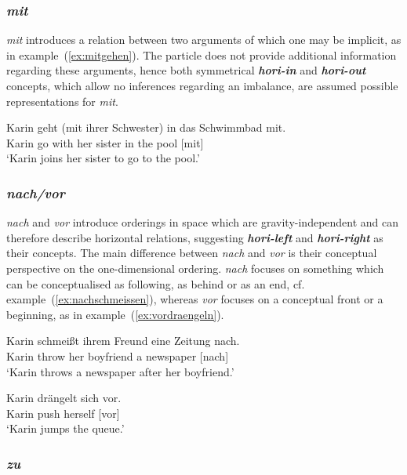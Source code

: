 \documentclass[output=paper]{langsci/langscibook}
\newcommand{\textci}[1]{\textit{\textbf{#1}}}
\begin{document}
\vspace{+1mm}
\subsubsection{\textit{mit}}

\textit{mit} introduces a relation between two arguments of which one
may be implicit, as in example~(\ref{ex:mitgehen}). The particle does
not provide additional information regarding these arguments, hence
both symmetrical \textci{hori-in} and \textci{hori-out} concepts,
which allow no inferences regarding an imbalance, are assumed possible
representations for \textit{mit}.

\ea\label{ex:mitgehen}
\gll Karin geht (mit ihrer Schwester) in das Schwimmbad mit.\\
Karin go with her sister in the pool [mit]\\
\glt `Karin joins her sister to go to the pool.'
\z

\vspace{+1mm}
\subsubsection{\textit{nach/vor}}

\textit{nach} and \textit{vor} introduce orderings in space which are
gravity-independent and can therefore describe horizontal relations,
suggesting \textci{hori-left} and \textci{hori-right} as their
concepts. The main difference between \textit{nach} and \textit{vor}
is their conceptual perspective on the one-dimensional
ordering. \textit{nach} focuses on something which can be
conceptualised as following, as behind or as an end, cf.
example~(\ref{ex:nachschmeissen}), whereas \textit{vor} focuses on a
conceptual front or a beginning, as in
example~(\ref{ex:vordraengeln}).

\ea\label{ex:nachschmeissen}
\gll Karin schmeißt ihrem Freund eine Zeitung nach.\\
Karin throw her boyfriend a newspaper [nach]\\
\glt `Karin throws a newspaper after her boyfriend.' 
\z

\ea\label{ex:vordraengeln}
\gll Karin drängelt sich vor.\\
Karin push herself [vor]\\
\glt `Karin jumps the queue.'
\z

\vspace{+1mm}
\subsubsection{\textit{zu}}
\end{document}

